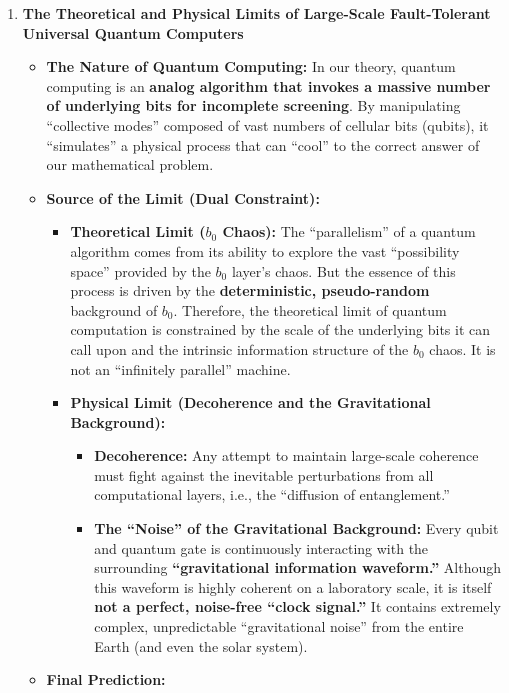 \documentclass[11pt, a4paper]{article}
\begin{document}
\begin{enumerate}
    \item \textbf{The Theoretical and Physical Limits of Large-Scale Fault-Tolerant Universal Quantum Computers}

    \begin{itemize}
        \item \textbf{The Nature of Quantum Computing:} In our theory, quantum computing is an \textbf{analog algorithm that invokes a massive number of underlying bits for incomplete screening}. By manipulating ``collective modes'' composed of vast numbers of cellular bits (qubits), it ``simulates'' a physical process that can ``cool'' to the correct answer of our mathematical problem.
        \item \textbf{Source of the Limit (Dual Constraint):}
        \begin{itemize}
            \item \textbf{Theoretical Limit ($b_0$ Chaos):} The ``parallelism'' of a quantum algorithm comes from its ability to explore the vast ``possibility space'' provided by the $b_0$ layer's chaos. But the essence of this process is driven by the \textbf{deterministic, pseudo-random} background of $b_0$. Therefore, the theoretical limit of quantum computation is constrained by the scale of the underlying bits it can call upon and the intrinsic information structure of the $b_0$ chaos. It is not an ``infinitely parallel'' machine.
            \item \textbf{Physical Limit (Decoherence and the Gravitational Background):}
            \begin{itemize}
                \item \textbf{Decoherence:} Any attempt to maintain large-scale coherence must fight against the inevitable perturbations from all computational layers, i.e., the ``diffusion of entanglement.''
                \item \textbf{The ``Noise'' of the Gravitational Background:} Every qubit and quantum gate is continuously interacting with the surrounding \textbf{``gravitational information waveform.''} Although this waveform is highly coherent on a laboratory scale, it is itself \textbf{not a perfect, noise-free ``clock signal.''} It contains extremely complex, unpredictable ``gravitational noise'' from the entire Earth (and even the solar system).
            \end{itemize}
        \end{itemize}
        \item \textbf{Final Prediction:}
        \begin{itemize}

\end{itemize}
\end{itemize}
\end{enumerate}
\end{document}
